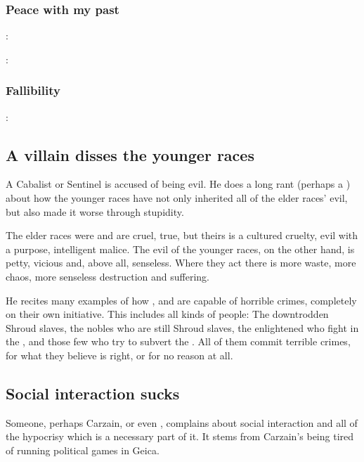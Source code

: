 \subsubsection{Peace with my past}
\Ishnaruchaefir: 

\Criseis: 





\subsubsection{Fallibility}
\Ishnaruchaefir: 







\subsection{A villain disses the younger races}
A Cabalist or Sentinel is accused of being evil. He does a long rant (perhaps a ) about how the younger races have not only inherited all of the elder races' evil, but also made it worse through stupidity. 

The elder races were and are cruel, true, but theirs is a cultured cruelty, evil with a purpose, intelligent malice. The evil of the younger races, on the other hand, is petty, vicious and, above all, senseless. Where they act there is more waste, more chaos, more senseless destruction and suffering. 

He recites many examples of how \humans{}, \scathae{} and \meccara{} are capable of horrible crimes, completely on their own initiative. This includes all kinds of people: The downtrodden Shroud slaves, the nobles who are still Shroud slaves, the enlightened who fight in the \secretwar, and those few who try to subvert the \secretwar. All of them commit terrible crimes, for what they believe is right, or for no reason at all.







\subsection{Social interaction sucks}
Someone, perhaps Carzain, or even \Ishna, complains about social interaction and all of the hypocrisy which is a necessary part of it. It stems from Carzain's being tired of running political games in Geica.







